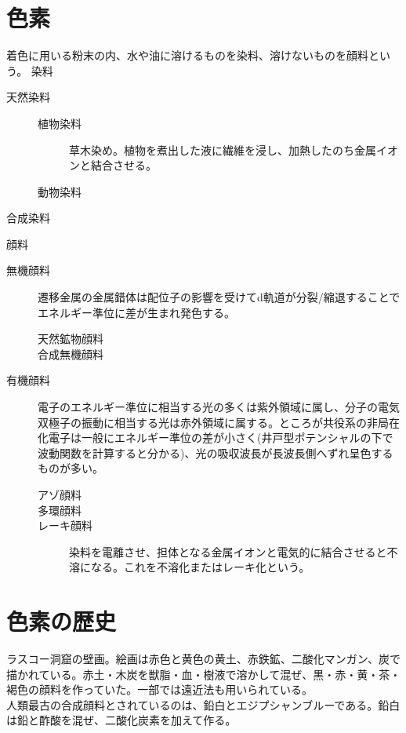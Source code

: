 
\section{色素}
	着色に用いる粉末の内、水や油に溶けるものを染料、溶けないものを顔料という。
	染料
	\begin{description}
		\item[天然染料]
		\begin{description}
			\item[植物染料] 草木染め。植物を煮出した液に繊維を浸し、加熱したのち金属イオンと結合させる。
			\item[動物染料]
		\end{description}
		\item[合成染料]
	\end{description}
	顔料
	\begin{description}
		\item[無機顔料] 遷移金属の金属錯体は配位子の影響を受けてd軌道が分裂/縮退することでエネルギー準位に差が生まれ発色する。
			\begin{description}
				\item[天然鉱物顔料] 
				\item[合成無機顔料] 
			\end{description}
		\item[有機顔料] 電子のエネルギー準位に相当する光の多くは紫外領域に属し、分子の電気双極子の振動に相当する光は赤外領域に属する。ところが共役系の非局在化電子は一般にエネルギー準位の差が小さく(井戸型ポテンシャルの下で波動関数を計算すると分かる)、光の吸収波長が長波長側へずれ呈色するものが多い。
			\begin{description}
				\item[アゾ顔料] 
				\item[多環顔料] 
				\item[レーキ顔料] 染料を電離させ、担体となる金属イオンと電気的に結合させると不溶になる。これを不溶化またはレーキ化という。
			\end{description}
	\end{description}
\section{色素の歴史}
	ラスコー洞窟の壁画。絵画は赤色と黄色の黄土、赤鉄鉱、二酸化マンガン、炭で描かれている。赤土・木炭を獣脂・血・樹液で溶かして混ぜ、黒・赤・黄・茶・褐色の顔料を作っていた。一部では遠近法も用いられている。\\
	人類最古の合成顔料とされているのは、鉛白とエジプシャンブルーである。鉛白は鉛と酢酸を混ぜ、二酸化炭素を加えて作る。
